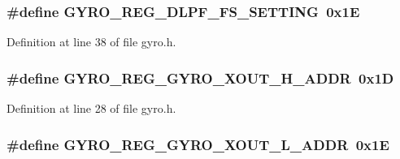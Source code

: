 \subsubsection[{\texorpdfstring{G\+Y\+R\+O\+\_\+\+R\+E\+G\+\_\+\+D\+L\+P\+F\+\_\+\+F\+S\+\_\+\+S\+E\+T\+T\+I\+NG}{GYRO_REG_DLPF_FS_SETTING}}]{\setlength{\rightskip}{0pt plus 5cm}\#define G\+Y\+R\+O\+\_\+\+R\+E\+G\+\_\+\+D\+L\+P\+F\+\_\+\+F\+S\+\_\+\+S\+E\+T\+T\+I\+NG~0x1E}\hypertarget{group___gyro_ga912da8a3df05ccb9099d12ac4c4f4ee6}{}\label{group___gyro_ga912da8a3df05ccb9099d12ac4c4f4ee6}


Definition at line 38 of file gyro.\+h.

\subsubsection[{\texorpdfstring{G\+Y\+R\+O\+\_\+\+R\+E\+G\+\_\+\+G\+Y\+R\+O\+\_\+\+X\+O\+U\+T\+\_\+\+H\+\_\+\+A\+D\+DR}{GYRO_REG_GYRO_XOUT_H_ADDR}}]{\setlength{\rightskip}{0pt plus 5cm}\#define G\+Y\+R\+O\+\_\+\+R\+E\+G\+\_\+\+G\+Y\+R\+O\+\_\+\+X\+O\+U\+T\+\_\+\+H\+\_\+\+A\+D\+DR~0x1D}\hypertarget{group___gyro_gac47edfa9d2921c9e5ec7f45e2ea09d31}{}\label{group___gyro_gac47edfa9d2921c9e5ec7f45e2ea09d31}


Definition at line 28 of file gyro.\+h.

\subsubsection[{\texorpdfstring{G\+Y\+R\+O\+\_\+\+R\+E\+G\+\_\+\+G\+Y\+R\+O\+\_\+\+X\+O\+U\+T\+\_\+\+L\+\_\+\+A\+D\+DR}{GYRO_REG_GYRO_XOUT_L_ADDR}}]{\setlength{\rightskip}{0pt plus 5cm}\#define G\+Y\+R\+O\+\_\+\+R\+E\+G\+\_\+\+G\+Y\+R\+O\+\_\+\+X\+O\+U\+T\+\_\+\+L\+\_\+\+A\+D\+DR~0x1E}\hypertarget{group___gyro_gabaadac15da96351f956fe9774578262d}{}\label{group___gyro_gabaadac15da96351f956fe9774578262d}


